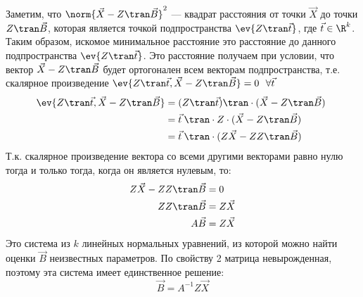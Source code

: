Заметим, что \(\norm{\vec{X} - Z\tran \vec{B}}^2\) --- квадрат расстояния от точки \(\vec{X}\) до точки \(Z\tran \vec{B}\), которая является точкой подпространства \(\ev{Z\tran \vec{t}}\), где \(\vec{t} \in \R^k\). Таким образом, искомое минимальное расстояние это расстояние до данного подпространства \(\ev{Z\tran \vec{t}}\). Это расстояние получаем при условии, что вектор \(\vec{X} - Z\tran \vec{B}\) будет ортогонален всем векторам подпространства, т.е. скалярное произведение \(\ev{Z\tran \vec{t}, \vec{X} - Z\tran \vec{B}} = 0 \ \ \forall \vec{t}\)
\begin{align*}
    \ev{Z\tran \vec{t}, \vec{X} - Z\tran \vec{B}}
     & = (Z\tran \vec{t})\tran \cdot (\vec{X} - Z\tran \vec{B})\ \\
     & = \vec{t}\:\tran \cdot Z \cdot (\vec{X} - Z\tran \vec{B}) \\
     & = \vec{t}\:\tran \cdot (Z\vec{X} - ZZ\tran \vec{B})
\end{align*}
Т.к. скалярное произведение вектора со всеми другими векторами равно нулю тогда и только тогда, когда он является нулевым, то:
\begin{align*}
    Z\vec{X} - ZZ\tran \vec{B} & = 0        \\
    ZZ\tran \vec{B}            & = Z\vec{X} \\
    A \vec{B}                  & = Z\vec{X}
\end{align*}
Это система из \(k\) линейных нормальных уравнений, из которой можно найти оценки \(\vec{B}\) неизвестных параметров. По свойству 2 матрица невырожденная, поэтому эта система имеет единственное решение:
\[\vec{B} = A^{-1}Z \vec{X}\]

